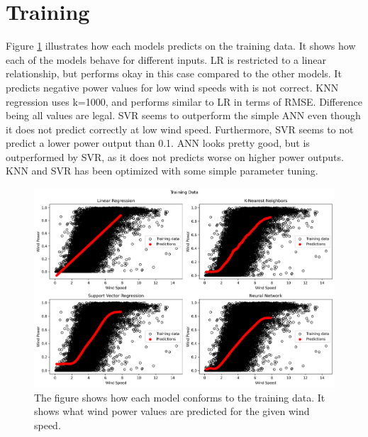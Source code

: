 \documentclass[a4paper, article, oneside, USenglish, IN5460]{memoir}
\begin{document}
\section{Training}
Figure \ref{fig:q1-training-data} illustrates how each models predicts on the training data. It shows how each of the models behave for different inputs. LR is restricted to a linear relationship, but performs okay in this case compared to the other models. It predicts negative power values for low wind speeds with is not correct. KNN regression uses k=1000, and performs similar to LR in terms of RMSE. Difference being all values are legal. SVR seems to outperform the simple ANN even though it does not predict correctly at low wind speed. Furthermore, SVR seems to not predict a lower power output than 0.1. ANN looks pretty good, but is outperformed by SVR, as it does not predicts worse on higher power outputs. KNN and SVR has been optimized with some simple parameter tuning.
\begin{figure}[H]
    \centering
    \includegraphics[width=1\linewidth]{fig/q1-ALL-training.png}
    \caption{The figure shows how each model conforms to the training data. It shows what wind power values are predicted for the given wind speed.}
    \label{fig:q1-training-data}
\end{figure}
\end{document}
